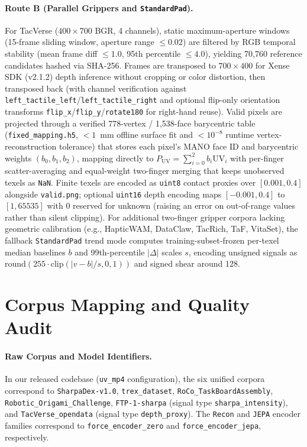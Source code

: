 \paragraph{Route B (Parallel Grippers and \texttt{StandardPad}).}
For TacVerse ($400\times 700$ BGR, 4 channels), static maximum-aperture windows (15-frame sliding window, aperture range $\le 0.02$) are filtered by RGB temporal stability (mean frame diff $\le 1.0$, 95th percentile $\le 4.0$), yielding 70,760 reference candidates hashed via SHA-256.
Frames are transposed to $700\times 400$ for Xense SDK (v2.1.2) depth inference without cropping or color distortion, then transposed back (with channel verification against \texttt{left\_tactile\_left}/\texttt{left\_tactile\_right} and optional flip-only orientation transforms \texttt{flip\_x}/\texttt{flip\_y}/\texttt{rotate180} for right-hand reuse).
Valid pixels are projected through a verified 778-vertex / 1,538-face barycentric table (\texttt{fixed\_mapping.h5}, $<1$~mm offline surface fit and $<10^{-8}$ runtime vertex-reconstruction tolerance) that stores each pixel's MANO face ID and barycentric weights $(b_0,b_1,b_2)$, mapping directly to $P_{\mathrm{UV}} = \sum_{i=0}^2 b_i \mathrm{UV}_i$ with per-finger scatter-averaging and equal-weight two-finger merging that keeps unobserved texels as \texttt{NaN}.
Finite texels are encoded as \texttt{uint8} contact proxies over $[0.001, 0.4]$ alongside \texttt{valid.png}; optional \texttt{uint16} depth encoding maps $[-0.001, 0.4]$ to $[1, 65535]$ with 0 reserved for unknown (raising an error on out-of-range values rather than silent clipping).
For additional two-finger gripper corpora lacking geometric calibration (e.g., HapticWAM, DataClaw, TacRich, TaF, VitaSet), the fallback \texttt{StandardPad} trend mode computes training-subset-frozen per-texel median baselines $b$ and 99th-percentile $|\Delta|$ scales $s$, encoding unsigned signals as $\mathrm{round}(255\cdot \mathrm{clip}(|v-b|/s, 0, 1))$ and signed shear around 128.

\section{Corpus Mapping and Quality Audit}
\label{app:audit}

\paragraph{Raw Corpus and Model Identifiers.}
In our released codebase (\texttt{uv\_mp4} configuration), the six unified corpora correspond to \texttt{SharpaDex-v1.0}, \texttt{trex\_dataset}, \texttt{RoCo\_TaskBoardAssembly}, \texttt{Robotic\_Origami\_Challenge}, \texttt{FTP-1-sharpa} (signal type \texttt{sharpa\_intensity}), and \texttt{TacVerse\_opendata} (signal type \texttt{depth\_proxy}).
The \texttt{Recon} and \texttt{JEPA} encoder families correspond to \texttt{force\_encoder\_zero} and \texttt{force\_encoder\_jepa}, respectively.

